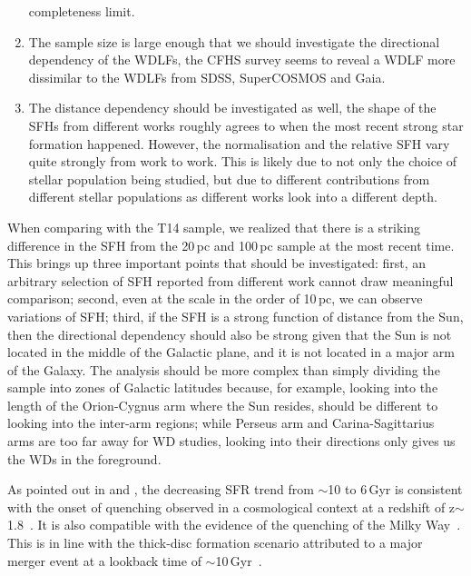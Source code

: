 \documentclass[fleqn,usenatbib]{mnras}
\begin{document}
\begin{enumerate}
    completeness limit.
    \item The sample size is large enough that we should investigate the
    directional dependency of the WDLFs, the CFHS survey seems to reveal a
    WDLF more dissimilar to the WDLFs from SDSS, SuperCOSMOS and Gaia.
    \item The distance dependency should be investigated as well, the shape of
    the SFHs from different works roughly agrees to when the most recent strong
    star formation happened. However, the normalisation and the relative SFH
    vary quite strongly from work to work. This is likely due to not only the
    choice of stellar population being studied, but due to different
    contributions from different stellar populations as different works look
    into a different depth.
\end{enumerate}

When comparing with the T14 sample, we realized that there is a striking 
difference in the SFH from the 20\,pc and 100\,pc sample at the most recent
time. This brings up three important points that should be investigated: first,
an arbitrary selection of SFH reported from different work cannot draw
meaningful comparison; second, even at the scale in the order of 10\,pc, we
can observe variations of SFH; third, if the SFH is a strong function of
distance from the Sun, then the directional dependency should also be strong
given that the Sun is not located in the middle of the Galactic plane, and it
is not located in a major arm of the Galaxy. The analysis should be more
complex than simply dividing the sample into zones of Galactic latitudes
because, for example, looking into the length of the Orion-Cygnus arm where
the Sun resides, should be different to looking into the inter-arm
regions; while Perseus arm and Carina-Sagittarius arms are too far away for WD
studies, looking into their directions only gives us the WDs in the foreground.

As pointed out in \citet{2019A&A...624L...1M} and \citet{2019ApJ...878L..11I},
the decreasing SFR trend from $\sim$10 to 6\,Gyr is consistent with the
onset of quenching observed in a cosmological context at a redshift of
z$\sim$1.8~\citep[corresponds to a lookback time of
$\sim$10\,Gyr, e.g.][]{2016MNRAS.461.1100R, 2017MNRAS.471.4155K}. It is
also compatible with the evidence of the quenching of the Milky
Way~\citep{2016A&A...589A..66H}. This is in line with the thick-disc formation
scenario attributed to a major merger event at a lookback time of 
$\sim$10\,Gyr~\citep{2018Natur.563...85H}.
\end{document}
